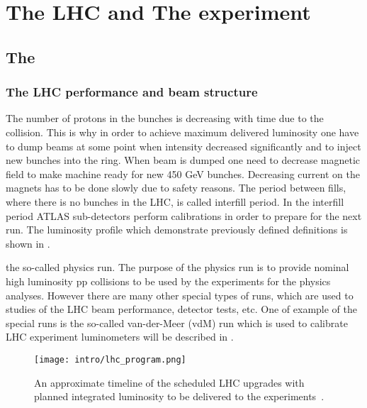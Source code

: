 \chapter{The LHC and The \ATLAS experiment}
\label{chap:MoreStuff}



\section{The \LHC}
\subsection{The LHC performance and beam structure}






The number of protons in the bunches is decreasing with time due to the collision.
This is why in order to achieve maximum delivered luminosity one have to dump beams at some point when intensity decreased significantly and to inject new bunches into the ring.
When beam is dumped one need to decrease magnetic field to make machine ready for new 450 GeV bunches. Decreasing current on the magnets has to be done slowly due to safety reasons.
The period between fills, where there is no bunches in the LHC, is called interfill period.
In the interfill period ATLAS sub-detectors perform calibrations in order to prepare for the next run. The luminosity profile which demonstrate previously defined definitions is shown in .

the so-called physics run. The purpose of the physics run is to provide nominal high luminosity pp collisions to be used by the experiments for the physics analyses.
However there are many other special types of runs, which are used to studies of the LHC beam performance, detector tests, etc.
One of example of the special runs is the so-called van-der-Meer (vdM) run which is used to calibrate LHC experiment luminometers will be described in .


\begin{figure}[]
  \centering
\texttt{[image: intro/lhc\_program.png]}
\caption{An approximate timeline of the scheduled LHC upgrades with planned integrated luminosity to be delivered to the experiments~\cite{Kawamoto:1552862}.}
\label{fig:wprime_limits}
\end{figure}


